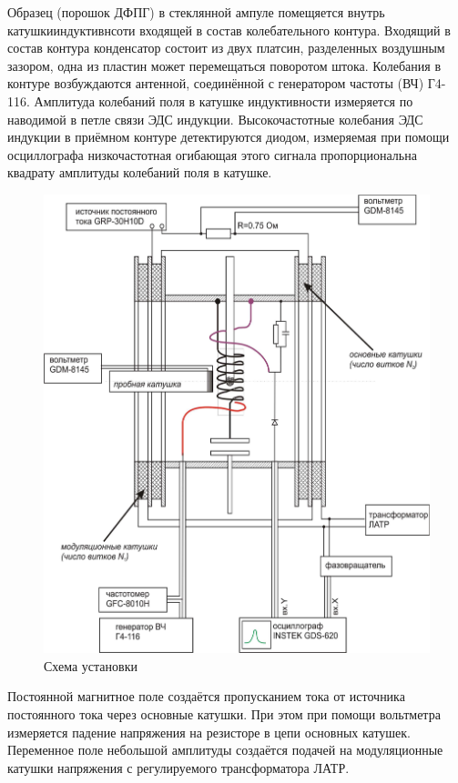 \documentclass[a4paper,12pt]{article} %
\begin{document}
    Образец (порошок ДФПГ) в стеклянной ампуле помещяется внутрь катушкииндуктивнсоти входящей в состав колебательного контура. 
    Входящий в состав контура конденсатор состоит из двух платсин, разделенных воздушным зазором, одна из пластин может перемещаться поворотом штока. 
    Колебания в контуре возбуждаются антенной, соединённой с генератором частоты (ВЧ) Г4-116. 
    Амплитуда колебаний поля в катушке индуктивности измеряется по наводимой в петле связи ЭДС индукции. 
    Высокочастотные колебания ЭДС индукции в приёмном контуре детектируются диодом, измеряемая при помощи осциллографа низкочастотная огибающая этого сигнала пропорциональна квадрату амплитуды колебаний поля в катушке.
    \begin{figure}[h!]
      \centering
      \includegraphics[scale=0.17]{img/equip.png}
      \caption{Схема установки}
    \end{figure}
    Постоянной магнитное поле создаётся пропусканием тока от источника постоянного тока через основные катушки. 
    При этом при помощи вольтметра измеряется падение напряжения на резисторе в цепи основных катушек. 
    Переменное поле небольшой амплитуды создаётся подачей на модуляционные катушки напряжения с регулируемого трансформатора ЛАТР. 
\end{document}
